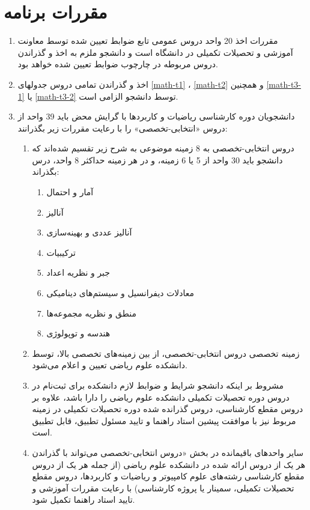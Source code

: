\documentclass{article}
\begin{document}
    \section{مقررات برنامه}
    \begin{enumerate}
        \item
        مقررات اخذ 20 واحد دروس عمومی تابع ضوابط تعیین شده توسط معاونت آموزشی و تحصیلات تکمیلی در دانشگاه است و دانشجو ملزم به اخذ و گذراندن دروس مربوطه در چارچوب ضوابط تعیین شده خواهد بود.
        \item
        اخذ و گذراندن تمامی دروس جدولهای
        \ref{math-t1}
        ،
		\ref{math-t2}
		و همچنین
		\ref{math-t3-1}
		یا
		\ref{math-t3-2}
         توسط دانشجو الزامی است.
        \item
		دانشجویان دوره کارشناسی ریاضیات و کاربردها با گرایش محض باید 39 واحد از دروس «انتخابی-تخصصی» را با رعایت مقررات زیر بگذرانند:
        \begin{enumerate}
            \item
          دروس انتخابی-تخصصی به 8 زمینه موضوعی به شرح زیر تقسیم شده‌اند که دانشجو باید 30 واحد از 5 یا 6 زمینه، و در هر زمینه حداکثر 8 واحد، درس بگذراند:
            \begin{enumerate}
                 \item
					آمار و احتمال
                 \item
						آنالیز
                 \item
					آنالیز عددی و بهینه‌سازی
                 \item
					ترکیبیات
                 \item
					جبر و نظریه اعداد
                 \item
					معادلات دیفرانسیل و سیستم‌های دینامیکی
                 \item
					منطق و نظریه مجموعه‌ها
                 \item
					هندسه و توپولوژی
            \end{enumerate}
            \item
		زمینه‌ تخصصی دروس انتخابی-تخصصی، از بین زمینه‌های تخصصی بالا، توسط دانشکده علوم ریاضی تعیین و اعلام می‌شود.
            \item
             مشروط بر اینکه دانشجو شرایط و ضوابط لازم دانشکده برای ثبت‌نام در دروس دوره تحصیلات تکمیلی دانشکده علوم ریاضی را دارا باشد، علاوه بر دروس مقطع کارشناسی، دروس گذرانده شده دوره تحصیلات تکمیلی در زمینه مربوط نیز با موافقت پیشین استاد راهنما و تایید مسئول تطبیق، قابل تطبیق است.
             \item
             سایر واحدهای باقیمانده در بخش «دروس انتخابی-تخصصی می‌تواند با گذراندن هر یک از دروس ارائه شده در دانشکده علوم ریاضی (از جمله هر یک از دروس مقطع کارشناسی رشته‌های علوم کامپیوتر و ریاضیات و کاربردها، دروس مقطع تحصیلات تکمیلی، سمینار یا پروژه کار‌شناسی) با رعایت مقررات آموزشی و تایید استاد راهنما تکمیل شود.

\end{enumerate}
\end{enumerate}
\end{document}

